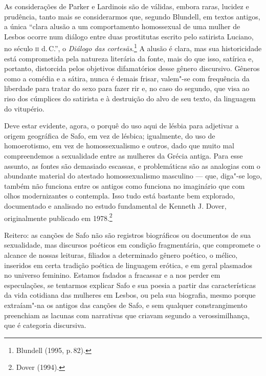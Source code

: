 As considerações de Parker e Lardinois são de válidas, embora raras, lucidez e
prudência, tanto mais se considerarmos que, segundo Blundell, em
textos antigos, a única “clara alusão a um comportamento homossexual de uma
mulher de Lesbos ocorre num diálogo entre duas prostitutas escrito pelo
satirista Luciano, no século \textsc{ii} d.\,C.”, o \emph{Diálogo das cortesãs}.\footnote{Blundell (1995, p.\,82).} A
alusão é clara, mas sua historicidade está comprometida pela natureza
literária da fonte, mais do que isso, satírica e, portanto, distorcida pelos objetivos difamatórios desse gênero discursivo. Gêneros como a
comédia e a sátira, nunca é demais frisar, valem"-se com frequência da liberdade
para tratar do sexo para fazer rir e, no caso do segundo, que visa ao riso dos
cúmplices do satirista e à destruição do alvo de seu texto, da linguagem do
vitupério. 

Deve estar evidente, agora, o porquê do uso aqui de lésbia para adjetivar a origem geográfica de Safo, em vez de lésbica; igualmente, do uso de homoerotismo, em vez de homossexualismo e outros, dado que muito mal compreendemos a sexualidade entre as mulheres da Grécia antiga. Para esse assunto, as fontes são demasiado escassas, e problemáticas são as analogias
com o abundante material do atestado homossexualismo masculino --- que,
diga"-se logo, também não funciona entre os antigos como funciona no imaginário
que com olhos modernizantes o contempla. Isso tudo está bastante
bem explorado, documentado e analisado no estudo fundamental de Kenneth J. Dover, 
originalmente publicado em 1978.\footnote{ Dover (1994).}

Reitero: as canções de Safo não
são registros biográficos ou documentos de sua sexualidade, mas discursos
poéticos em condição fragmentária, que compromete o alcance de nossas leituras,
filiados a determinado gênero poético, o mélico, inseridos em certa tradição
poética de linguagem erótica, e em geral plasmados no universo feminino. Estamos fadados a fracassar e a nos perder em
especulações, se tentarmos explicar Safo e sua poesia a partir das
características da vida cotidiana das mulheres em Lesbos, ou pela sua
biografia, mesmo porque extraíam"-na os antigos das canções de Safo, e
sem qualquer constrangimento preenchiam as lacunas com narrativas
que criavam segundo a verossimilhança, que é categoria discursiva.

